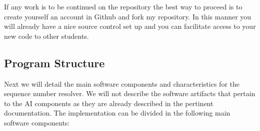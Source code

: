 \documentclass[a4paper,10pt,titlepage]{article}
\begin{document}
If any work is to be continued on the repository the best way to proceed is to create yourself an account in Github and fork my repository. In this manner you will already have a nice source control set up and you can facilitate access to your new code to other students. 


\subsection{Program Structure}

\par Next we will detail the main software components and characteristics for the sequence number resolver. We will not describe the software artifacts that pertain to the AI components as they are already described in the pertinent documentation. The implementation can be divided in the following main software components:
\end{document}
